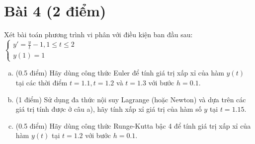 \documentclass[11pt]{article}
\newcommand{\Solution}{
\medskip
{\bf \underline{Đáp án}:}
}
\begin{document}
% 
% 
% 
%      
%      
%      


\section{Bài 4 (2 điểm)}

Xét bài toán phương trình vi phân với điều kiện ban đầu sau:
$
 \left\lbrace \begin{array}{l}
               y' = \frac{y}{t}-1, 1 \leq t \leq 2 \\
               y(1)=1
              \end{array}
\right.
$

\begin{enumerate}[a).]
\item (0.5 điểm) Hãy dùng công thức Euler để tính giá trị xấp xỉ của hàm $y(t)$ tại các thời điểm $t=1.1, t=1.2$ và $t=1.3$ với bước $h=0.1$.
\item (1 điểm) Sử dụng đa thức nội suy Lagrange (hoặc Newton) và dựa trên các giá trị tính được ở câu a), hãy tính xấp xỉ giá trị của hàm số $y$ tại $t=1.15$.
\item (0.5 điểm) Hãy dùng công thức Runge-Kutta bậc 4 để tính giá trị xấp xỉ của hàm $y(t)$ tại $t=1.2$ với bước $h=0.1$.
\end{enumerate}
\end{document}
